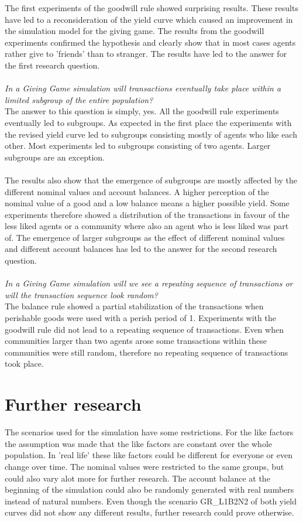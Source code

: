 \documentclass[twoside,openright]{uva-bachelor-thesis}
\begin{document}
The first experiments of the goodwill rule showed surprising results. These results have led to a reconsideration of the yield curve which caused an improvement in the simulation model for the giving game. The results from the goodwill experiments confirmed the hypothesis and clearly show that in most cases agents rather give to 'friends' than to stranger. The results have led to the answer for the first research question. \\ 
\\
\textit{In a Giving Game simulation will transactions eventually take place within a limited subgroup of the entire population?} \\
The answer to this question is simply, yes. All the goodwill rule experiments eventually led to subgroups. As expected in the first place the experiments with the revised yield curve led to subgroups consisting mostly of agents who like each other. Most experiments led to subgroups consisting of two agents. Larger subgroups are an exception.
\\
\\
The results also show that the emergence of subgroups are mostly affected by the different nominal values and account balances. A higher perception of the nominal value of a good and a low balance means a higher possible yield. Some experiments therefore showed a distribution of the transactions in favour of the less liked agents or a community where also an agent who is less liked was part of. The emergence of larger subgroups as the effect of different nominal values and different account balances has led to the answer for the second research question.
\\
\\
\textit{In a Giving Game simulation will we see a repeating sequence of transactions or will the transaction sequence look random?} \\
The balance rule showed a partial stabilization of the transactions when perishable goods were used with a perish period of 1. Experiments with the goodwill rule did not lead to a repeating sequence of transactions. Even when communities larger than two agents arose some transactions within these communities were still random, therefore no repeating sequence of transactions took place.

\section{Further research}
The scenarios used for the simulation have some restrictions. For the like factors the assumption was made that the like factors are constant over the whole population. In 'real life' these like factors could be different for everyone or even change over time. The nominal values were restricted to the same groups, but could also vary alot more for further research. The account balance at the beginning of the simulation could also be randomly generated with real numbers instead of natural numbers. Even though the scenario GR\_L1B2N2 of both yield curves did not show any different results, further research could prove otherwise.
\end{document}

